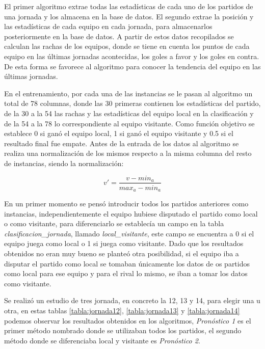 El primer algoritmo extrae todas las estadísticas de cada uno de los partidos de una jornada y los almacena en la base de datos. El segundo extrae la posición y las estadísticas de cada equipo en cada jornada, para almacenarlos posteriormente en la base de datos. A partir de estos datos recopilados se calculan las rachas de los equipos, donde se tiene en cuenta los puntos de cada equipo en las últimas jornadas acontecidas, los goles a favor y  los goles en contra. De esta forma se favorece al algoritmo para conocer la tendencia del equipo en las últimas jornadas. 

En el entrenamiento, por cada una de las instancias se le pasan al algoritmo un total de 78 columnas, donde las 30 primeras contienen los estadísticas del partido, de la 30 a la 54 las rachas y las estadísticas del equipo local en la clasificación y de la 54 a la 78 lo correspondiente al equipo visitante. Como función objetivo se establece 0 si ganó el equipo local, 1 si ganó el equipo visitante y 0.5 si el resultado final fue empate.
Antes de la entrada de los datos al algoritmo se realiza una normalización de los mismos respecto a la misma columna del resto de instancias, siendo la normalización:
\begin{center}
\large{$$v' = \frac{v-min_{a}}{max_{a}-min_{a}}$$}
\end{center}

En un primer momento se pensó introducir todos los partidos anteriores como instancias, independientemente el equipo hubiese disputado el partido como local o como visitante, para diferenciarlo se establecía un campo en la tabla \textit{clasificacion\_jornada}, llamado \textit{local\_visitante}, este campo se encuentra a 0 si el equipo juega como local o 1 si juega como visitante. Dado que los resultados obtenidos no eran muy bueno se planteó otra posibilidad, si el equipo iba a disputar el partido como local se tomaban únicamente los datos de os partidos como local para ese equipo y para el rival lo mismo, se iban a tomar los datos como visitante.

Se realizó un estudio de tres jornada, en concreto la 12, 13 y 14, para elegir una u otra, en estas tablas \ref{tabla:jornada12}, \ref{tabla:jornada13} y \ref{tabla:jornada14} podemos observar los resultados obtenidos en los algoritmos, \textit{Pronóstico 1} es el primer método nombrado donde se utilizaban todos los partidos, el segundo método donde se diferenciaba local y visitante es \textit{Pronóstico 2}.


